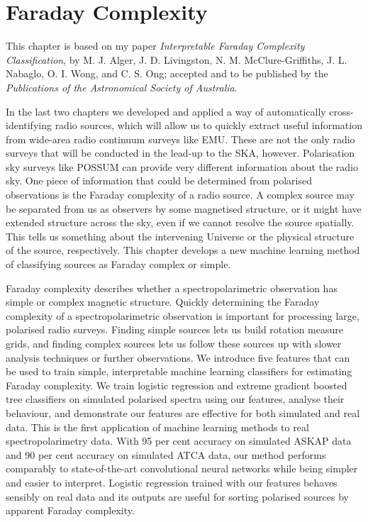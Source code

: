 \documentclass[11pt, a4paper]{book}
\makeatletter
\newcounter{savesection}
\newcounter{apdxsection}
\newcommand\unappendix{\par
  \setcounter{apdxsection}{\value{section}}%
  \setcounter{section}{\value{savesection}}%
  \setcounter{subsection}{0}%
  \gdef\thesection{\@arabic\c@section}}
\providecommand{\DIFaddend}{} %
\DeclareRobustCommand{\DIFaddend}{\DIFOaddend \let\includegraphics\DIFOincludegraphics} %
\makeatother
\begin{document}
\unappendix

\DIFaddend %
\chapter{Faraday Complexity}
\label{cha:faraday}

This chapter is based on my paper \emph{Interpretable Faraday Complexity Classification}, by M. J. Alger, J. D. Livingston, N. M. McClure-Griffiths, J. L. Nabaglo, O. I. Wong, and C. S. Ong; accepted and to be published by the \emph{Publications of the Astronomical Society of Australia}.

In the last two chapters we developed and applied a way of automatically cross-identifying radio sources, which will allow us to quickly extract useful information from wide-area radio continuum surveys like EMU. These are not the only radio surveys that will be conducted in the lead-up to the SKA, however. Polarisation sky surveys like POSSUM can provide very different information about the radio sky. One piece of information that could be determined from polarised observations is the Faraday complexity of a radio source. A complex source may be separated from us as observers by some magnetised structure, or it might have extended structure across the sky, even if we cannot resolve the source spatially. This tells us something about the intervening Universe or the physical structure of the source, respectively. This chapter develops a new machine learning method of classifying sources as Faraday complex or simple.

Faraday complexity describes whether a spectropolarimetric observation has simple or complex magnetic structure. Quickly determining the Faraday complexity of a spectropolarimetric observation is important for processing large, polarised radio surveys. Finding simple sources lets us build rotation measure grids, and finding complex sources lets us follow these sources up with slower analysis techniques or further observations. We introduce five features that can be used to train simple, interpretable machine learning classifiers for estimating Faraday complexity. We train logistic regression and extreme gradient boosted tree classifiers on simulated polarised spectra using our features, analyse their behaviour, and demonstrate our features are effective for both simulated and real data. This is the first application of machine learning methods to real spectropolarimetry data. With 95 per cent accuracy on simulated ASKAP data and 90 per cent accuracy on simulated ATCA data, our method performs comparably to state-of-the-art convolutional neural networks while being simpler and easier to interpret. Logistic regression trained with our features behaves sensibly on real data and its outputs are useful for sorting polarised sources by apparent Faraday complexity.
\end{document}

